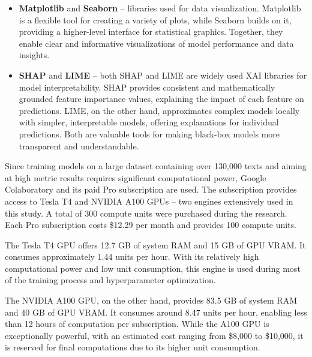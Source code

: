 \begin{itemize}
    \item \textbf{Matplotlib} and \textbf{Seaborn} -- libraries used for data visualization. Matplotlib is a flexible tool for creating a variety of plots, while Seaborn builds on it, providing a higher-level interface for statistical graphics. Together, they enable clear and informative visualizations of model performance and data insights.

    \item \textbf{SHAP} and \textbf{LIME} -- both SHAP and LIME are widely used XAI libraries for model interpretability. SHAP provides consistent and mathematically grounded feature importance values, explaining the impact of each feature on predictions. LIME, on the other hand, approximates complex models locally with simpler, interpretable models, offering explanations for individual predictions. Both are valuable tools for making black-box models more transparent and understandable.
    
\end{itemize}

\vspace{3mm}

Since training models on a large dataset containing over 130,000 texts and aiming at high metric results requires significant computational power, Google Colaboratory and its paid Pro subscription are used. The subscription provides access to Tesla T4 and NVIDIA A100 GPUs -- two engines extensively used in this study. A total of 300 compute units were purchased during the research. Each Pro subscription costs \$12.29 per month and provides 100 compute units.

\vspace{3mm}

The Tesla T4 GPU offers 12.7 GB of system RAM and 15 GB of GPU VRAM. It consumes approximately 1.44 units per hour. With its relatively high computational power and low unit consumption, this engine is used during most of the training process and hyperparameter optimization.

\vspace{3mm}

The NVIDIA A100 GPU, on the other hand, provides 83.5 GB of system RAM and 40 GB of GPU VRAM. It consumes around 8.47 units per hour, enabling less than 12 hours of computation per subscription. While the A100 GPU is exceptionally powerful, with an estimated cost ranging from \$8,000 to \$10,000, it is reserved for final computations due to its higher unit consumption.

